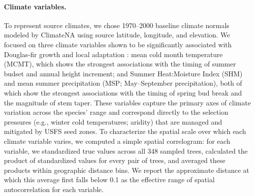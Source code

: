 \documentclass[]{article}
\newcommand{\dfir}{Douglas-fir\xspace}
\begin{document}
\paragraph{Climate variables.}
To represent source climates,
we chose 1970--2000 baseline climate normals modeled by
ClimateNA \citep{mahony_global_2022} using source latitude, longitude, and elevation.
We focused on three climate variables shown to be significantly
associated with \dfir growth and local adaptation \citep{stclair_genecology_2005}:
mean cold month temperature (MCMT), which shows the strongest
associations with the timing of summer budset and annual height
increment; and Summer Heat:Moisture Index (SHM) and mean summer
precipitation (MSP; May--September precipitation),
both of which show the strongest associations with
the timing of spring bud break and the magnitude of stem taper.
These variables capture the primary axes of climate variation
across the species' range and correspond directly to the selection
pressures (e.g., winter cold temperatures; aridity) that are
managed and mitigated by USFS seed zones.
To characterize the spatial scale over which each climate variable
varies, we computed a simple spatial correlogram: for each variable,
we standardized true values across all 348 sampled trees, calculated
the product of standardized values for every pair of trees, and
averaged these products within geographic distance bins. We report
the approximate distance at which this average first falls below 0.1
as the effective range of spatial autocorrelation for each variable.
\end{document}
